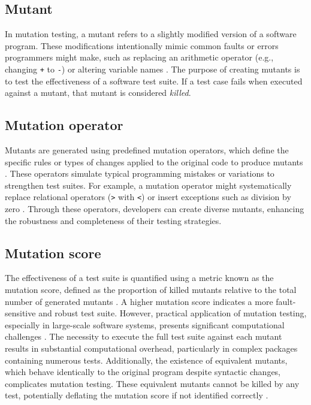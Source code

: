 \subsection{Mutant}

In mutation testing, a mutant refers to a slightly modified version of a software program. These modifications intentionally mimic common faults or errors programmers might make, such as replacing an arithmetic operator (e.g., changing \texttt{+} to \texttt{-}) or altering variable names \cite{jia2011analysis}. The purpose of creating mutants is to test the effectiveness of a software test suite. If a test case fails when executed against a mutant, that mutant is considered \textit{killed}. 

\subsection{Mutation operator}

Mutants are generated using predefined mutation operators, which define the specific rules or types of changes applied to the original code to produce mutants \cite{offutt1996practical}. These operators simulate typical programming mistakes or variations to strengthen test suites. For example, a mutation operator might systematically replace relational operators (\texttt{>} with \texttt{<}) or insert exceptions such as division by zero \cite{jia2011analysis}. Through these operators, developers can create diverse mutants, enhancing the robustness and completeness of their testing strategies.

\subsection{Mutation score}

The effectiveness of a test suite is quantified using a metric known as the mutation score, defined as the proportion of killed mutants relative to the total number of generated mutants \cite{jia2011analysis}. A higher mutation score indicates a more fault-sensitive and robust test suite. However, practical application of mutation testing, especially in large-scale software systems, presents significant computational challenges \cite{petrovic2018industrial}. The necessity to execute the full test suite against each mutant results in substantial computational overhead, particularly in complex packages containing numerous tests. Additionally, the existence of equivalent mutants, which behave identically to the original program despite syntactic changes, complicates mutation testing. These equivalent mutants cannot be killed by any test, potentially deflating the mutation score if not identified correctly \cite{offutt1996practical}.

